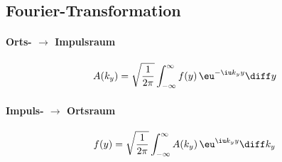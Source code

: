 	
	\subsection{Fourier-Transformation} %
		\paragraph{Orts- $\rightarrow$ Impulsraum} %
			\[
				A(k_y) = \sqrt{\frac{1}{2\pi}} \int_{-\infty}^{\infty} f(y) \, \eu^{-\iu k_y y} \diff y
			\]
		\paragraph{Impuls- $\rightarrow$ Ortsraum} %
			\[
				f(y) = \sqrt{\frac{1}{2\pi}} \int_{-\infty}^{\infty} A(k_y) \, \eu^{\iu k_y y} \diff k_y
			\]
	
